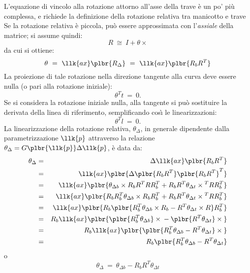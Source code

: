 \documentclass[12pt,dvips,fleqn,italian]{article}
\begin{document}
\noindent
L'equazione di vincolo alla rotazione attorno all'asse della trave
\`e un po' pi\`u complessa, e richiede la definizione della rotazione
relativa tra manicotto e trave
Se la rotazione relativa \`e piccola, pu\`o essere approssimata 
con l'\emph{assiale} della matrice; si assume quindi:
\begin{displaymath}
	R \ \cong \ I + \theta\times{}
\end{displaymath}
da cui si ottiene:
\begin{displaymath}
	\theta \ = \ \llk{ax}\plbr{R_{\Delta}} 
		\ = \ \llk{ax}\plbr{R_bR^T}
\end{displaymath}
La proiezione di tale rotazione nella direzione tangente alla curva 
deve essere nulla (o pari alla rotazione iniziale):
\begin{displaymath}
	\theta^T t \ = \ 0 .
\end{displaymath}
Se si considera la rotazione iniziale nulla, alla tangente si pu\`o 
sostituire la derivata della linea di riferimento, semplificando cos\`{\i}
le linearizzazioni:
\begin{displaymath}
	\theta^T l \ = \ 0 .
\end{displaymath}
La linearizzazione della rotazione relativa, $\theta_{\Delta}$,
in generale dipendente dalla parametrizzazione $\llk{p}$ attraverso
la relazione $ \theta_{\Delta}=G\plbr{\llk{p}}\Delta{\llk{p}} $, 
\`e data da:
\begin{eqnarray*}
	\theta_{\Delta} & = & \Delta\llk{ax}\plbr{R_bR^T} \\
	& = & \llk{ax}\plbr{\Delta\plbr{R_bR^T}\plbr{R_bR^T}^T} \\
	& = & \llk{ax}\plbr{\theta_{\Delta{b}}\times{R_bR^TRR_b^T}
		+R_bR^T\theta_{\Delta{t}}\times{}^TRR_b^T} \\
	& = & \llk{ax}\plbr{R_bR_b^T\theta_{\Delta{b}}\times{R_bR_b^T}
		+R_bR^T\theta_{\Delta{t}}\times{}^TRR_b^T} \\
	& = & \llk{ax}\plbr{
		R_b\plbr{
			R_b^T\theta_{\Delta{b}}\times{R_b}
			-R^T\theta_{\Delta{t}}\times{R}
		}R_b^T
	} \\
	& = & R_b\llk{ax}\plbr{
		\plbr{R_b^T\theta_{\Delta{b}}}\times{}
		-\plbr{R^T\theta_{\Delta{t}}}\times{}
	} \\
	& = & R_b\llk{ax}\plbr{\plbr{
		R_b^T\theta_{\Delta{b}} - R^T\theta_{\Delta{t}}
	}\times{}} \\
	& = & R_b\plbr{R_b^T\theta_{\Delta{b}}-R^T\theta_{\Delta{t}}}
\end{eqnarray*}
o
\begin{displaymath}
	\theta_{\Delta} \ = \ \theta_{\Delta{b}}-R_bR^T\theta_{\Delta{t}}
\end{displaymath}
\end{document}
